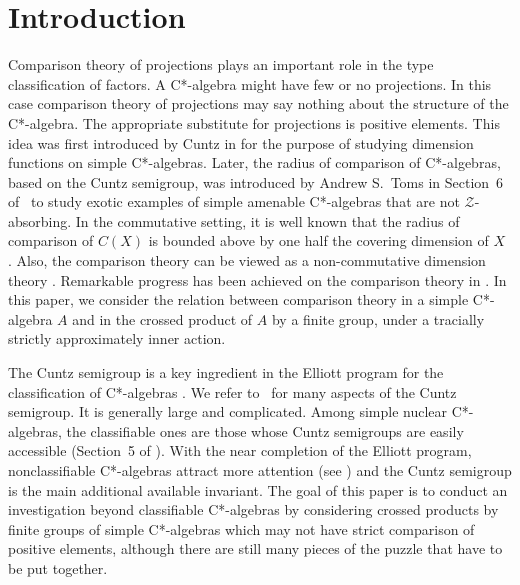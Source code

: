 \documentclass[10pt]{amsart}
\numberwithin{equation}{section}
\theoremstyle{definition}
\newcommand{\ca}{C*-algebra}
\begin{document}
\section{Introduction}\label{Sec_Intro}
Comparison theory of projections plays an important role in the type classification of factors.
A C*-algebra might have few or no projections. 
In this case comparison theory of projections may say 
nothing about the structure of the C*-algebra. 
The appropriate substitute for projections is positive elements.
This idea was first introduced by Cuntz in \cite{Cun78} for the purpose  of studying dimension functions on simple C*-algebras.
Later, the radius of comparison of C*-algebras, based on the Cuntz semigroup,
was introduced by Andrew S.~Toms
in Section~6 of~\cite{Tom06} to study  exotic examples of simple amenable
C*-algebras that are not $\mathcal{Z}$-absorbing.
In the commutative setting, it
is well known that the radius of comparison of $C(X)$ is bounded above 
by one half the covering dimension of $X$ \cite{BRTTW12, EN13}. Also, the comparison theory can be viewed as a non-commutative dimension
theory \cite{AA20}.
Remarkable progress has been achieved on the comparison theory
in \cite{BRTTW12, HP19, Ni14, Ph16, Ph14}. 
In this paper, we consider the relation between comparison
theory in a simple C*-algebra $A$ and in the crossed product of $A$ by
a finite group, under a tracially strictly approximately inner action.

The  Cuntz semigroup is a key ingredient in the Elliott program for the classification of C*-algebras \cite{ET08, Tom08}.
We refer to~\cite{APT11, TT15} for many aspects of the Cuntz semigroup.
It is generally large and complicated.
Among simple nuclear \ca{s},
the classifiable ones are those whose Cuntz semigroups
are easily accessible (Section~5 of \cite{APT11}).
With the near completion of the Elliott program,
nonclassifiable \ca{s} attract more attention (see \cite{AGP19, HP19, Ph16})
and the Cuntz semigroup is the main additional available invariant.
The goal of this paper
is to conduct an investigation  beyond classifiable C*-algebras by
considering crossed products by finite groups of simple C*-algebras which may not have strict comparison of positive elements, 
although there are still many pieces of the puzzle that have to be put together.
\end{document}
